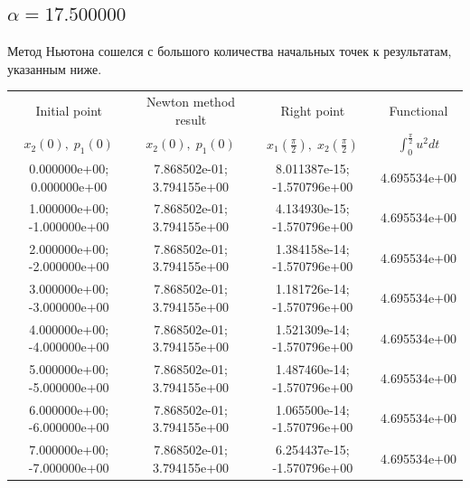 \documentclass[titlepage]{article}
\def\l{\left}
\def\r{\right}
\begin{document}
\subsection{$\alpha = 17.500000$} 
Метод Ньютона сошелся с большого количества начальных точек к результатам, указанным ниже. \\ 
\begin{tabular}{ | c | c | c | c |} 
\hline 
Initial point  & Newton method result & Right point & Functional 
 \\ $x_2(0), \; p_1(0)$ & $x_2(0), \; p_1(0)$ & $x_1\l(\frac{\pi}{2}\r), \; x_2\l(\frac{\pi}{2}\r)$ & $\int_{0}^{\frac{\pi}{2}}u^2dt$  \\ \hline 
0.000000e+00; 0.000000e+00 & 7.868502e-01; 3.794155e+00 & 8.011387e-15; -1.570796e+00 & 4.695534e+00 \\ \hline 
1.000000e+00; -1.000000e+00 & 7.868502e-01; 3.794155e+00 & 4.134930e-15; -1.570796e+00 & 4.695534e+00 \\ \hline 
2.000000e+00; -2.000000e+00 & 7.868502e-01; 3.794155e+00 & 1.384158e-14; -1.570796e+00 & 4.695534e+00 \\ \hline 
3.000000e+00; -3.000000e+00 & 7.868502e-01; 3.794155e+00 & 1.181726e-14; -1.570796e+00 & 4.695534e+00 \\ \hline 
4.000000e+00; -4.000000e+00 & 7.868502e-01; 3.794155e+00 & 1.521309e-14; -1.570796e+00 & 4.695534e+00 \\ \hline 
5.000000e+00; -5.000000e+00 & 7.868502e-01; 3.794155e+00 & 1.487460e-14; -1.570796e+00 & 4.695534e+00 \\ \hline 
6.000000e+00; -6.000000e+00 & 7.868502e-01; 3.794155e+00 & 1.065500e-14; -1.570796e+00 & 4.695534e+00 \\ \hline 
7.000000e+00; -7.000000e+00 & 7.868502e-01; 3.794155e+00 & 6.254437e-15; -1.570796e+00 & 4.695534e+00 \\ \hline 
\end{tabular} 
\end{document}
